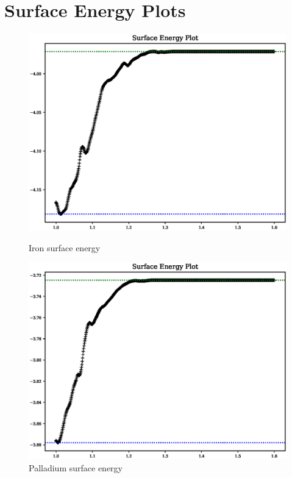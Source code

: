 \FloatBarrier
\section{Surface Energy Plots}
\label{section:fepdv1se}

\begin{figure}[ht] 
  \begin{minipage}[b]{0.4\linewidth}
    \centering
    \includegraphics[width=.9\linewidth]{chapters/results_potential_fitting/pot_fepd_fcc_1/fe_surface_energy.eps} 
    \caption{Iron surface energy}  
    \label{fig:fev1surface}
  \end{minipage}%
  \begin{minipage}[b]{0.4\linewidth}
    \centering
    \includegraphics[width=.9\linewidth]{chapters/results_potential_fitting/pot_fepd_fcc_1/pd_surface_energy.eps} 
    \caption{Palladium surface energy}  
    \label{fig:pdv1surface}
  \end{minipage}%
\end{figure}
\FloatBarrier




